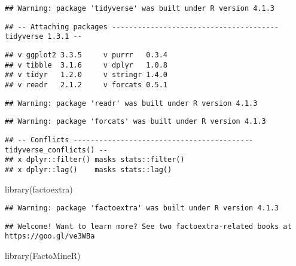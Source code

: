 \documentclass[
]{article}
\newenvironment{Shaded}{\begin{snugshade}}{\end{snugshade}}
\newcommand{\FunctionTok}[1]{\textcolor[rgb]{0.00,0.00,0.00}{#1}}
\newcommand{\NormalTok}[1]{#1}
\begin{document}
\begin{verbatim}
## Warning: package 'tidyverse' was built under R version 4.1.3
\end{verbatim}

\begin{verbatim}
## -- Attaching packages --------------------------------------- tidyverse 1.3.1 --
\end{verbatim}

\begin{verbatim}
## v ggplot2 3.3.5     v purrr   0.3.4
## v tibble  3.1.6     v dplyr   1.0.8
## v tidyr   1.2.0     v stringr 1.4.0
## v readr   2.1.2     v forcats 0.5.1
\end{verbatim}

\begin{verbatim}
## Warning: package 'readr' was built under R version 4.1.3
\end{verbatim}

\begin{verbatim}
## Warning: package 'forcats' was built under R version 4.1.3
\end{verbatim}

\begin{verbatim}
## -- Conflicts ------------------------------------------ tidyverse_conflicts() --
## x dplyr::filter() masks stats::filter()
## x dplyr::lag()    masks stats::lag()
\end{verbatim}

\begin{Shaded}
\begin{Highlighting}[]
\FunctionTok{library}\NormalTok{(factoextra) }
\end{Highlighting}
\end{Shaded}

\begin{verbatim}
## Warning: package 'factoextra' was built under R version 4.1.3
\end{verbatim}

\begin{verbatim}
## Welcome! Want to learn more? See two factoextra-related books at https://goo.gl/ve3WBa
\end{verbatim}

\begin{Shaded}
\begin{Highlighting}[]
\FunctionTok{library}\NormalTok{(FactoMineR)}
\end{Highlighting}
\end{Shaded}
\end{document}
